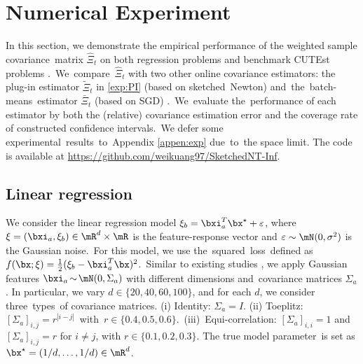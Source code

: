 
\section{Numerical Experiment}\label{sec:5}

In this section, we demonstrate the empirical performance of the weighted sample covariance~\mbox{matrix} $\hat{\Xi}_t$ on both regression problems and benchmark CUTEst problems \citep{Gould2014CUTEst}.~We~\mbox{compare}~$\hat{\Xi}_t$ with two other online covariance estimators: the plug-in estimator $\tilde{\Xi}_t$ in \eqref{exp:PI} 
(based on sketched~Newton) and~the~batch-means~estimator $\bar{\Xi}_t$ (based on SGD) \cite[Algorithm 2]{Zhu2021Online}.~We~evaluate the~performance of each estimator by both the (relative) covariance estimation error and the coverage rate of constructed confidence intervals.~We defer some experimental~results~to~Appendix \ref{appen:exp} due~to~the space limit. {The code is available at \url{https://github.com/weikuang97/SketchedNT-Inf}}.


\subsection{Linear regression}\label{sec5:linear}

We consider the linear regression model $\xi_{b} = \bxi_{a}^T\bx^{\star} + \varepsilon$, where $\xi = (\bxi_a, \xi_b)\in\mR^d\times \mR$ is the feature-response vector and $\varepsilon\sim\mN(0, \sigma^2)$ is the Gaussian noise.~For this model, we use the~squared~loss~defined as $f(\bx; \xi) = \frac{1}{2}(\xi_{b}-\bxi_{a}^T\bx)^2$.~Similar to existing studies \citep{Chen2020Statistical, Zhu2021Online, Na2022Statistical}, we apply Gaussian features $\bxi_a\hskip-1.5pt \sim\hskip-1.5pt \mN(0, \Sigma_a)$ with different dimensions and~covariance matrices $\Sigma_a$. In particular, we vary $d\in\{20, 40, 60, 100\}$, and for each $d$, we consider three~types~of covariance matrices. (i) Identity: $\Sigma_a = I$. (ii) Toeplitz:~$[\Sigma_a]_{i,j} = r^{|i-j|}$~with~\mbox{$r\in\{0.4, 0.5, 0.6\}$}.~(iii)~Equi-correlation: $[\Sigma_a]_{i,i}=1$ and $[\Sigma_a]_{i,j} = r$ for $i\neq j$, with $r\in\{0.1,0.2,0.3\}$. The true model parameter~is set as $\bx^\star = (1/d,\dots,1/d)\in\mR^d$.



